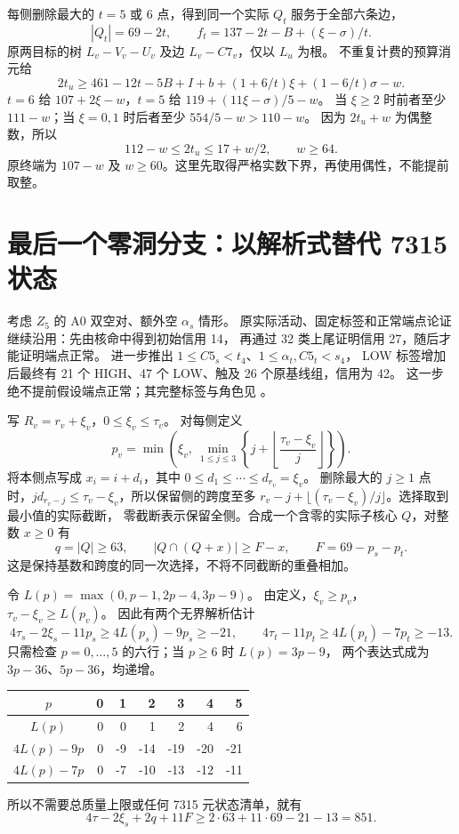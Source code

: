 \documentclass[11pt,a4paper]{article}
\begin{document}
每侧删除最大的 $t=5$ 或 $6$ 点，得到同一个实际 $Q_t$ 服务于全部六条边，
\[
|Q_t|=69-2t,\qquad
f_t=137-2t-B+(\xi-\sigma)/t.
\]
原两目标的树 $L_v-V_v-U_v$ 及边 $L_v-C7_v$，仅以 $L_u$ 为根。
不重复计费的预算消元给
\[
2t_u\ge461-12t-5B+I+b+(1+6/t)\xi+(1-6/t)\sigma-w.
\]
$t=6$ 给 $107+2\xi-w$，$t=5$ 给 $119+(11\xi-\sigma)/5-w$。
当 $\xi\ge2$ 时前者至少 $111-w$；当 $\xi=0,1$ 时后者至少 $554/5-w>110-w$。
因为 $2t_u+w$ 为偶整数，所以
\begin{equation}\label{eq:112}
\boxed{112-w\le2t_u\le17+w/2,\qquad w\ge64.}
\end{equation}
原终端为 $107-w$ 及 $w\ge60$。这里先取得严格实数下界，再使用偶性，不能提前取整。

\section{最后一个零洞分支：以解析式替代 7315 状态}\label{sec:alpha}
考虑 $Z_5$ 的 A0 双空对、额外空 $\alpha_s$ 情形。
原实际活动、固定标签和正常端点论证继续沿用：先由核命中得到初始信用 14，
再通过 32 类上尾证明信用 27，随后才能证明端点正常。
进一步推出 $1\le C5_s<t_4$、$1\le\alpha_t,C5_t<s_4$，
LOW 标签增加后最终有 21 个 HIGH、47 个 LOW、触及 26 个原基线组，信用为 42。
这一步绝不提前假设端点正常；其完整标签与角色见
。

写 $R_v=r_v+\xi_v$，$0\le\xi_v\le\tau_v$。
对每侧定义
\[
p_v=\min\left(\xi_v,\ \min_{1\le j\le3}\left\{j+\left\lfloor\frac{\tau_v-\xi_v}{j}\right\rfloor\right\}\right).
\]
将本侧点写成 $x_i=i+d_i$，其中 $0\le d_1\le\cdots\le d_{r_v}=\xi_v$。
删除最大的 $j\ge1$ 点时，$j d_{r_v-j}\le\tau_v-\xi_v$，所以保留侧的跨度至多
$r_v-j+\lfloor(\tau_v-\xi_v)/j\rfloor$。选择取到最小值的实际截断，
零截断表示保留全侧。合成一个含零的实际子核心 $Q$，对整数 $x\ge0$ 有
\[q=|Q|\ge63,\qquad |Q\cap(Q+x)|\ge F-x,\qquad F=69-p_s-p_t.\]
这是保持基数和跨度的同一次选择，不将不同截断的重叠相加。

令 $L(p)=\max(0,p-1,2p-4,3p-9)$。
由定义，$\xi_v\ge p_v$，$\tau_v-\xi_v\ge L(p_v)$。
因此有两个无界解析估计
\[
4\tau_s-2\xi_s-11p_s\ge4L(p_s)-9p_s\ge-21,\qquad
4\tau_t-11p_t\ge4L(p_t)-7p_t\ge-13.
\]
只需检查 $p=0,\ldots,5$ 的六行；当 $p\ge6$ 时 $L(p)=3p-9$，
两个表达式成为 $3p-36$、$5p-36$，均递增。
\begin{center}\small
\begin{tabular}{c|rrrrrr}
\toprule $p$&0&1&2&3&4&5\\\midrule
$L(p)$&0&0&1&2&4&6\\
$4L(p)-9p$&0&-9&-14&-19&-20&-21\\
$4L(p)-7p$&0&-7&-10&-13&-12&-11\\\bottomrule
\end{tabular}
\end{center}
所以不需要总质量上限或任何 7315 元状态清单，就有
\begin{equation}\label{eq:851}
4\tau-2\xi_s+2q+11F\ge2\cdot63+11\cdot69-21-13=851.
\end{equation}
\end{document}
